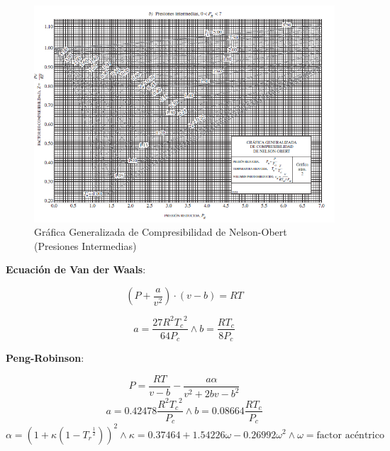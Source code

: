             \begin{figure}
                \centering
                \includegraphics[width=\textwidth]{img/diagramas/nelson_obert_2.png}
                \caption[Gráfica Generalizada de Compresibilidad de Nelson-Obert (Presiones Intermedias)]{Gráfica Generalizada de Compresibilidad de Nelson-Obert (Presiones Intermedias) \cite{cengel_termodinamica_2012}}
                \label{fig:nelson_obert_2}
            \end{figure}
            
            
            \textbf{Ecuación de Van der Waals}:
            
            \begin{equation}
            \label{van_der_waals}
                \left ( P + \frac{a}{v^{2}}\right )\cdot (v-b) = RT
            \end{equation}
            
            \begin{equation}
                a=\frac{27R^{2}{T_{c}}^{2}}{64P_{c}}\wedge b=\frac{RT_{c}}{8P_{c}}
            \end{equation}
            
            \textbf{Peng-Robinson}:
            
            \begin{equation}
                P=\frac{RT}{v-b} - \frac{a\alpha}{v^{2}+2bv-b^{2}}
            \end{equation}
            \[a=0.42478\frac{R^{2}{T_{c}}^{2}}{P_{c}}\wedge b=0.08664\frac{RT_{c}}{P_{c}}\]
            \[\alpha = \left ( 1 + \kappa \left ( 1 - {T_{r}}^{\frac{1}{2}}\right ) \right )^{2} \wedge \kappa = 0.37464 + 1.54226\omega - 0.26992 {\omega}^{2} \wedge \omega = \text{factor acéntrico}\]
            
